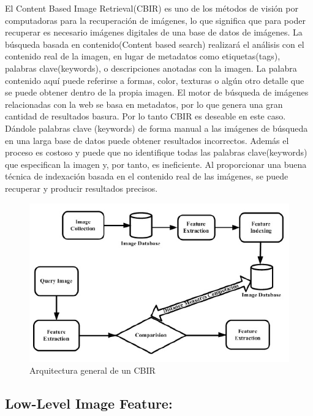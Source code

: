 \documentclass{llncs}
\begin{document}
El Content Based Image Retrieval(CBIR) es uno de los m\'etodos de visi\'on por computadoras para la recuperaci\'on de
im\'agenes, lo que significa que para poder recuperar es necesario im\'agenes digitales de una base de datos de im\'agenes. 
La b\'usqueda basada en contenido(Content based search) realizar\'a el an\'alisis con el contenido real de la imagen, en 
lugar de metadatos como etiquetas(tags), palabras clave(keywords), o descripciones anotadas con la imagen. La palabra 
contenido aqu\'i puede referirse a formas, color, texturas o alg\'un otro detalle que se puede obtener dentro de la propia
imagen. El motor de búsqueda de imágenes relacionadas con la web se basa en metadatos, por lo que genera una gran cantidad 
de resultados basura. Por lo tanto CBIR es deseable en este caso. D\'andole palabras clave (keywords) de forma manual a las 
im\'agenes de b\'usqueda en una larga base de datos puede obtener resultados incorrectos. Adem\'as el proceso es costoso y 
puede que no identifique todas las palabras clave(keywords) que especifican la imagen y, por tanto, es ineficiente. Al 
proporcionar una buena técnica de indexación basada en el contenido real de las imágenes, se puede recuperar y producir
resultados precisos.
\\
\begin{figure}
    \caption{Arquitectura general de un CBIR}
    \includegraphics[scale = .3]{./images/cbir arquitecture.png}
\end{figure}




\subsection{Low-Level Image Feature:}
\end{document}
